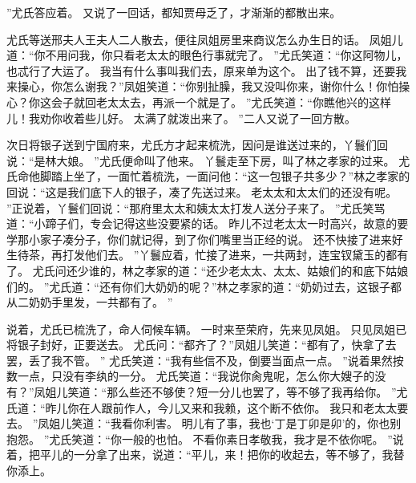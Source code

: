 ”尤氏答应着。
又说了一回话，都知贾母乏了，才渐渐的都散出来。
\par
尤氏等送邢夫人王夫人二人散去，便往凤姐房里来商议怎么办生日的话。
凤姐儿道：“你不用问我，你只看老太太的眼色行事就完了。
”尤氏笑道：“你这阿物儿，
也忒行了大运了。
我当有什么事叫我们去，原来单为这个。
出了钱不算，还要我来操心，你怎么谢我？”凤姐笑道：“你别扯臊，我又没叫你来，谢你什么！你怕操心？你这会子就回老太太去，再派一个就是了。
”尤氏笑道：“你瞧他兴的这样儿！我劝你收着些儿好。
太满了就泼出来了。
”二人又说了一回方散。
\par
次日将银子送到宁国府来，尤氏方才起来梳洗，因问是谁送过来的，丫鬟们回说：“是林大娘。
”尤氏便命叫了他来。
丫鬟走至下房，叫了林之孝家的过来。
尤氏命他脚踏上坐了，一面忙着梳洗，一面问他：“这一包银子共多少？”林之孝家的回说：“这是我们底下人的银子，凑了先送过来。
老太太和太太们的还没有呢。
”正说着，丫鬟们回说：“那府里太太和姨太太打发人送分子来了。
”尤氏笑骂道：“小蹄子们，专会记得这些没要紧的话。
昨儿不过老太太一时高兴，故意的要学那小家子凑分子，你们就记得，到了你们嘴里当正经的说。
还不快接了进来好生待茶，再打发他们去。
”丫鬟应着，忙接了进来，一共两封，连宝钗黛玉的都有了。
尤氏问还少谁的，林之孝家的道：“还少老太太、太太、姑娘们的和底下姑娘们的。
”尤氏道：“还有你们大奶奶的呢？”林之孝家的道：“奶奶过去，这银子都从二奶奶手里发，一共都有了。
”\par
说着，尤氏已梳洗了，命人伺候车辆。
一时来至荣府，先来见凤姐。
只见凤姐已将银子封好，正要送去。
尤氏问：“都齐了？”凤姐儿笑道：“都有了，快拿了去罢，丢了我不管。
”
尤氏笑道：“我有些信不及，倒要当面点一点。
”说着果然按数一点，只没有李纨的一分。
尤氏笑道：“我说你肏鬼呢，怎么你大嫂子的没有？”凤姐儿笑道：“那么些还不够使？短一分儿也罢了，等不够了我再给你。
”尤氏道：“昨儿你在人跟前作人，今儿又来和我赖，这个断不依你。
我只和老太太要去。
”凤姐儿笑道：“我看你利害。
明儿有了事，我也‘丁是丁卯是卯’的，你也别抱怨。
”尤氏笑道：“你一般的也怕。
不看你素日孝敬我，我才是不依你呢。
”说着，把平儿的一分拿了出来，说道：“平儿，来！把你的收起去，等不够了，我替你添上。
